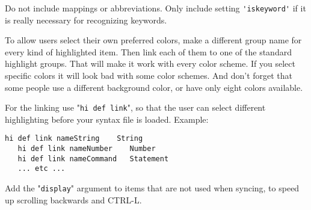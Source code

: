 Do not include mappings or abbreviations.
Only include setting \verb!'iskeyword'! if it is really necessary for recognizing keywords.

To allow users select their own preferred colors, make a different group name for every kind of highlighted item.
Then link each of them to one of the standard highlight groups.
That will make it work with every color scheme.
If you select specific colors it will look bad with some color schemes.
And don't forget that some people use a different background color, or have only eight colors available.

For the linking use "\verb!hi def link!", so that the user can select different highlighting before your syntax file is loaded.
Example:

\begin{Verbatim}[samepage=true]
   hi def link nameString    String
   hi def link nameNumber    Number
   hi def link nameCommand   Statement
   ... etc ...
\end{Verbatim}

Add the "\verb!display!" argument to items that are not used when syncing, to speed up scrolling backwards and CTRL-L.
\clearpage
